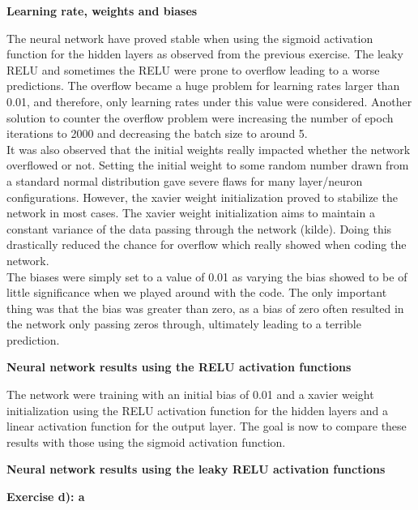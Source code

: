 \documentclass[12pt,a4paper]{article}
\begin{document}
\begin{center}
\large{\textbf{Learning rate, weights and biases}}
\end{center}

\noindent The neural network have proved stable when using the sigmoid activation function for the hidden layers as observed from the previous exercise. The leaky RELU and sometimes the RELU were prone to overflow leading to a worse predictions. The overflow became a huge problem for learning rates larger than 0.01, and therefore, only learning rates under this value were considered. Another solution to counter the overflow problem were increasing the number of epoch iterations to 2000 and decreasing the batch size to around 5. 
\\
It was also observed that the initial weights really impacted whether the network overflowed or not. Setting the initial weight to some random number drawn from a standard normal distribution gave severe flaws for many layer/neuron configurations. However, the xavier weight initialization proved to stabilize the network in most cases. The xavier weight initialization aims to maintain a constant variance of the data passing through the network (kilde). Doing this drastically reduced the chance for overflow which really showed when coding the network.
\\
The biases were simply set to a value of 0.01 as varying the bias showed to be of little significance when we played around with the code. The only important thing was that the bias was greater than zero, as a bias of zero often resulted in the network only passing zeros through, ultimately leading to a terrible prediction.

\begin{center}
\large{\textbf{Neural network results using the RELU activation functions}}
\end{center}

\noindent The network were training with an initial bias of 0.01 and a xavier weight initialization using the RELU activation function for the hidden layers and a linear activation function for the output layer. The goal is now to compare these results with those using the sigmoid activation function. 

\begin{center}
\large{\textbf{Neural network results using the leaky RELU activation functions}}
\end{center}

\newpage

\begin{center}
\Large{\textbf{Exercise d): a}}
\end{center}
\end{document}

